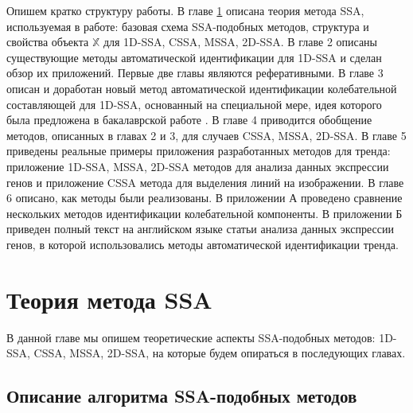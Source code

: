 \documentclass[specialist,
               substylefile = spbu.rtx,
               subf,href,colorlinks=true, 12pt]{disser}
\begin{document}
Опишем кратко структуру работы. В главе \ref{sec:ssa_theory} описана теория метода SSA, используемая в работе: базовая схема SSA-подобных методов, структура и свойства объекта $\mathbb{X}$ для 1D-SSA, CSSA, MSSA, 2D-SSA. 
В главе 2 описаны существующие методы автоматической идентификации для 1D-SSA и сделан обзор их приложений.
Первые две главы являются реферативными. В главе 3 описан и  доработан новый метод автоматической идентификации колебательной составляющей для 1D-SSA, основанный на специальной мере, идея которого была предложена в бакалаврской работе \cite{Zhornikova2016}. 
В главе 4 приводится обобщение методов, описанных в главах 2 и 3, для случаев CSSA, MSSA, 2D-SSA.
В главе 5 приведены реальные примеры приложения разработанных методов для тренда:
приложение 1D-SSA, MSSA, 2D-SSA методов для анализа данных экспрессии генов и приложение CSSA метода для выделения линий на изображении. В главе 6 описано, как методы были реализованы.
В приложении А проведено сравнение нескольких методов идентификации колебательной компоненты. В приложении Б приведен полный текст на английском языке статьи анализа данных экспрессии генов, в которой использовались методы автоматической идентификации тренда. 


\chapter{Теория метода SSA}
\label{sec:ssa_theory}

В данной главе мы опишем теоретические аспекты SSA-подобных методов: 1D-SSA, CSSA, MSSA, 2D-SSA, на которые будем опираться в последующих главах. 

\section{Описание алгоритма SSA-подобных методов}
\label{sec:ssa_alg}
\end{document}
